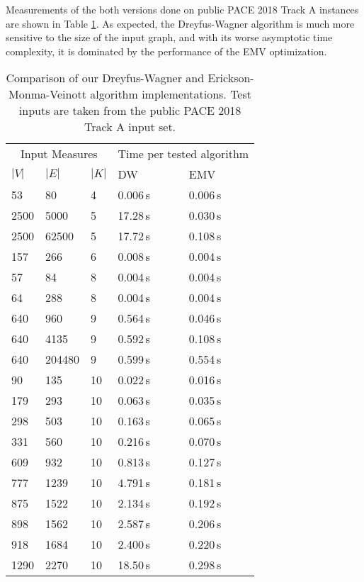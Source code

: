 \documentclass[thesis=M,english,hidelinks]{FITthesis}[2012/10/20]
\theoremstyle{definition}
\begin{document}
Measurements of the both versions done on public PACE 2018 Track A instances are shown in Table \ref{tab:dwemvcomp}. As
expected, the Dreyfus-Wagner algorithm is much more sensitive to the size of the input graph, and with its worse
asymptotic time complexity, it is dominated by the performance of the EMV optimization.

\begin{table}[ht]

    \centering
    \begin{tabular}{ m{1.5cm} m{1.5cm} m{1.5cm} | m{2.5cm} m{2.5cm} }
        \multicolumn{3}{c}{Input Measures} & \multicolumn{2}{c}{Time per tested algorithm} \vspace{0.25cm} \\
        $|V|$ & $|E|$ & $|K|$ & \textsc{DW} & \textsc{EMV} \\
        \midrule
        53 & 80 & 4 & 0.006\,s & 0.006\,s \\
        2500 & 5000 & 5 & 17.28\,s & 0.030\,s \\
        2500 & 62500 & 5 & 17.72\,s & 0.108\,s \\
        157 & 266 & 6 & 0.008\,s & 0.004\,s \\
        57 & 84 & 8 & 0.004\,s & 0.004\,s \\
        64 & 288 & 8 & 0.004\,s & 0.004\,s \\
        640 & 960 & 9 & 0.564\,s & 0.046\,s \\
        640 & 4135 & 9 & 0.592\,s & 0.108\,s \\
        640 & 204480 & 9 & 0.599\,s & 0.554\,s \\
        90 & 135 & 10 & 0.022\,s & 0.016\,s \\
        179 & 293 & 10 & 0.063\,s & 0.035\,s \\
        298 & 503 & 10 & 0.163\,s & 0.065\,s \\
        331 & 560 & 10 & 0.216\,s & 0.070\,s \\
        609 & 932 & 10 & 0.813\,s & 0.127\,s \\
        777 & 1239 & 10 & 4.791\,s & 0.181\,s \\
        875 & 1522 & 10 & 2.134\,s & 0.192\,s \\
        898 & 1562 & 10 & 2.587\,s & 0.206\,s \\
        918 & 1684 & 10 & 2.400\,s & 0.220\,s \\
        1290 & 2270 & 10 & 18.50\,s & 0.298\,s \\
    \end{tabular}

    \caption{Comparison of our Dreyfus-Wagner and Erickson-Monma-Veinott algorithm implementations. Test inputs are
    taken from the public PACE 2018 Track A input set.}
    \label{tab:dwemvcomp}
\end{table}
\end{document}
